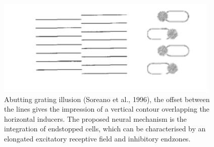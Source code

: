 \documentclass[12pt]{article}
\begin{document}
\begin{figure}
    \centering
    \includegraphics[width=0.95\textwidth]{figures/simple_abutting.png}
    \caption{Abutting grating illusion (Soreano et al., 1996), the offset between the lines gives the impression of a vertical contour overlapping the horizontal inducers. 
    The proposed neural mechanism is the integration of endstopped cells, which can be characterised by an elongated excitatory receptive field and inhibitory endzones.}
    \label{fig:figure_1}
\end{figure}



\end{document}
